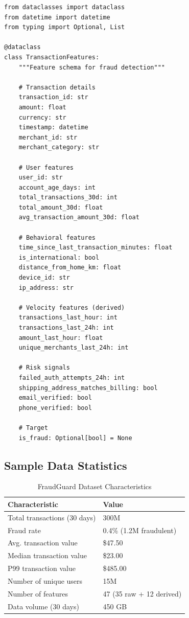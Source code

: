 \begin{lstlisting}[style=python, caption=FraudGuard Feature Schema]
from dataclasses import dataclass
from datetime import datetime
from typing import Optional, List

@dataclass
class TransactionFeatures:
    """Feature schema for fraud detection"""

    # Transaction details
    transaction_id: str
    amount: float
    currency: str
    timestamp: datetime
    merchant_id: str
    merchant_category: str

    # User features
    user_id: str
    account_age_days: int
    total_transactions_30d: int
    total_amount_30d: float
    avg_transaction_amount_30d: float

    # Behavioral features
    time_since_last_transaction_minutes: float
    is_international: bool
    distance_from_home_km: float
    device_id: str
    ip_address: str

    # Velocity features (derived)
    transactions_last_hour: int
    transactions_last_24h: int
    amount_last_hour: float
    unique_merchants_last_24h: int

    # Risk signals
    failed_auth_attempts_24h: int
    shipping_address_matches_billing: bool
    email_verified: bool
    phone_verified: bool

    # Target
    is_fraud: Optional[bool] = None
\end{lstlisting}

\subsection{Sample Data Statistics}

\begin{table}[h]
\centering
\caption{FraudGuard Dataset Characteristics}
\begin{tabular}{@{}ll@{}}
\toprule
\textbf{Characteristic} & \textbf{Value} \\
\midrule
Total transactions (30 days) & 300M \\
Fraud rate & 0.4\% (1.2M fraudulent) \\
Avg. transaction value & \$47.50 \\
Median transaction value & \$23.00 \\
P99 transaction value & \$485.00 \\
Number of unique users & 15M \\
Number of features & 47 (35 raw + 12 derived) \\
Data volume (30 days) & 450 GB \\
\bottomrule
\end{tabular}
\end{table}

